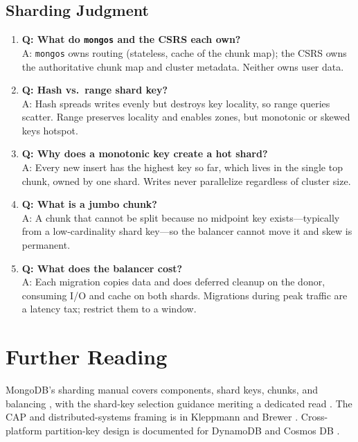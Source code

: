 \subsection{Sharding Judgment}
\begin{enumerate}
    \item \textbf{Q: What do \texttt{mongos} and the CSRS each own?}\\
    A: \texttt{mongos} owns routing (stateless, cache of the chunk map); the CSRS owns the authoritative chunk map and cluster metadata. Neither owns user data.

    \item \textbf{Q: Hash vs.\ range shard key?}\\
    A: Hash spreads writes evenly but destroys key locality, so range queries scatter. Range preserves locality and enables zones, but monotonic or skewed keys hotspot.

    \item \textbf{Q: Why does a monotonic key create a hot shard?}\\
    A: Every new insert has the highest key so far, which lives in the single top chunk, owned by one shard. Writes never parallelize regardless of cluster size.

    \item \textbf{Q: What is a jumbo chunk?}\\
    A: A chunk that cannot be split because no midpoint key exists---typically from a low-cardinality shard key---so the balancer cannot move it and skew is permanent.

    \item \textbf{Q: What does the balancer cost?}\\
    A: Each migration copies data and does deferred cleanup on the donor, consuming I/O and cache on both shards. Migrations during peak traffic are a latency tax; restrict them to a window.
\end{enumerate}

\section{Further Reading}
MongoDB's sharding manual covers components, shard keys, chunks, and balancing \cite{mongodbShardingDocs}, with the shard-key selection guidance meriting a dedicated read \cite{mongodbShardKeyDocs}. The CAP and distributed-systems framing is in Kleppmann \cite{kleppmann2017ddia} and Brewer \cite{brewer2012cap}. Cross-platform partition-key design is documented for DynamoDB \cite{dynamodbSingleTableDocs} and Cosmos DB \cite{cosmosPartitionDocs}.

